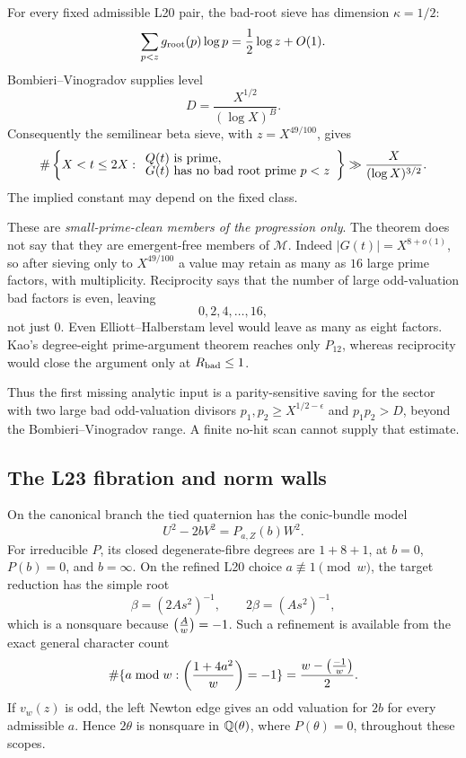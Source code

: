 \begin{theorem}
\label{thm:halfsieve}
For every fixed admissible L20 pair, the bad-root sieve has dimension
\(\kappa=1/2\):
\[
 \sum_{p<z}g_{\rm root}(p)\log p
   =\frac12\log z+O(1).
\]
Bombieri--Vinogradov supplies level
\[
 D=\frac{X^{1/2}}{(\log X)^B}.
\]
Consequently the semilinear beta sieve, with \(z=X^{49/100}\), gives
\[
 \#\left\{X<t\le2X:
   \begin{array}{l}
      Q(t)\ {\rm is\ prime},\\[-2pt]
      G(t)\ {\rm has\ no\ bad\ root\ prime}\ p<z
   \end{array}\right\}
 \gg \frac{X}{(\log X)^{3/2}} .
\]
The implied constant may depend on the fixed class.
\end{theorem}

These are \emph{small-prime-clean members of the progression only}.  The
theorem does not say that they are emergent-free members of
\(\mathcal M\).  Indeed \(|G(t)|=X^{8+o(1)}\), so after sieving only to
\(X^{49/100}\) a value may retain as many as \(16\) large prime factors,
with multiplicity.  Reciprocity says that the number of large
odd-valuation bad factors is even, leaving
\[
 0,2,4,\ldots,16,
\]
not just \(0\).  Even Elliott--Halberstam level would leave as many as
eight factors.  Kao's degree-eight prime-argument theorem reaches only
\(P_{12}\), whereas reciprocity would close the argument only at
\(R_{\rm bad}\le1\).

Thus the first missing analytic input is a parity-sensitive saving for
the sector with two large bad odd-valuation divisors
\(p_1,p_2\ge X^{1/2-\epsilon}\) and \(p_1p_2>D\), beyond the
Bombieri--Vinogradov range.  A finite no-hit scan cannot supply that
estimate.

\subsection{The L23 fibration and norm walls}

On the canonical branch the tied quaternion has the conic-bundle model
\[
 U^2-2bV^2=P_{a,Z}(b)W^2 .
\]
For irreducible \(P\), its closed degenerate-fibre degrees are
\(1+8+1\), at \(b=0\), \(P(b)=0\), and \(b=\infty\).  On the refined
L20 choice \(a\not\equiv1\pmod w\), the target reduction has the simple
root
\[
 \beta=(2As^2)^{-1},\qquad
 2\beta=(As^2)^{-1},
\]
which is a nonsquare because \(\left(\frac{A}{w}\right)=-1\).  Such a refinement is
available from the exact general character count
\[
 \#\{a\bmod w:\left(\frac{1+4a^2}{w}\right)=-1\}
   =\frac{w-\left(\frac{-1}{w}\right)}2 .
\]
If \(v_w(z)\) is odd, the left Newton edge gives an odd valuation for
\(2b\) for every admissible \(a\).  Hence \(2\theta\) is nonsquare in
\(\mathbb{Q}(\theta)\), where \(P(\theta)=0\), throughout these scopes.

